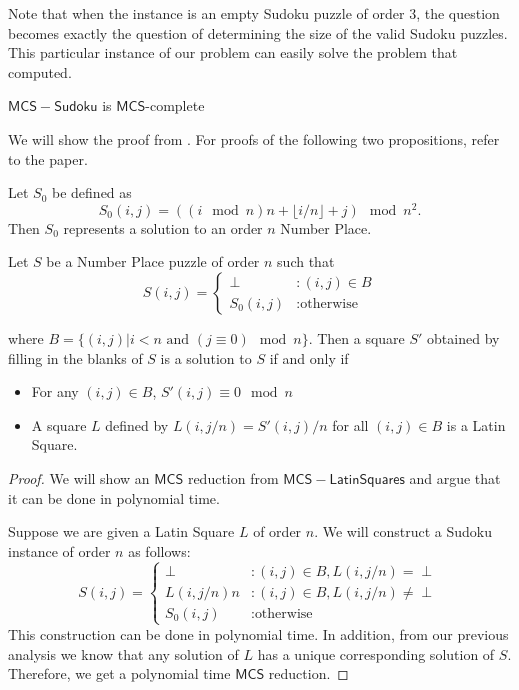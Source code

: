 \documentclass[runningheads,a4paper]{llncs}
\begin{document}
\begin{definition}
Note that when the instance is an empty Sudoku puzzle of order 3, the question becomes exactly the question of determining the size of the valid Sudoku puzzles. This particular instance of our problem can easily solve the problem that \cite{mcguire2012there} computed. 

\begin{theorem}
$\mathsf{MCS-Sudoku}$ is $\mathsf{MCS}$-complete
\end{theorem}

We will show the proof from \cite{takayuki2003complexity}. For proofs of the following two propositions, refer to the paper. 

\begin{proposition}
Let $S_0$ be defined as
$$S_0 (i,j) = ((i \mod n) n + \lfloor i/n \rfloor + j) \mod n^2. $$
Then $S_0$ represents a solution to an order $n$ Number Place. 
\end{proposition}

\begin{proposition}
Let $S$ be a Number Place puzzle of order $n$ such that
\begin{displaymath}
S(i,j) = \left\{
\begin{array}{lr}
\perp & : (i,j) \in B\\
S_0 (i,j) & : \text{otherwise}
\end{array}
\right.
\end{displaymath}

where $B = \{ (i,j) | i < n \text{ and } (j \equiv 0) \mod n \}$. Then a square $S'$ obtained by filling in the blanks of $S$ is a solution to $S$ if and only if

\begin{itemize}
\item For any $(i,j) \in B$, $S'(i,j) \equiv 0 \mod n$
\item A square $L$ defined by $L(i, j/n) = S'(i,j)/n$ for all $(i, j) \in B$ is a Latin Square.
\end{itemize}

\end{proposition}

\begin{proof} 

We will show an $\mathsf{MCS}$ reduction from $\mathsf{MCS-Latin Squares}$ and argue that it can be done in polynomial time.

Suppose we are given a Latin Square $L$ of order $n$. We will construct a Sudoku instance of order $n$ as follows:
\begin{displaymath}
S(i,j) = \left\{
\begin{array}{lr}
\perp & : (i,j) \in B, L(i, j/n) = \perp \\
L(i, j/n) n & : (i,j) \in B, L(i, j/n) \neq \perp \\
S_0 (i,j) & : \text{otherwise}
\end{array}
\right.
\end{displaymath}
This construction can be done in polynomial time. In addition, from our previous analysis we know that any solution of $L$ has a unique corresponding solution of $S$. Therefore, we get a polynomial time $\mathsf{MCS}$ reduction.


\end{proof}
\end{definition}
\end{document}

